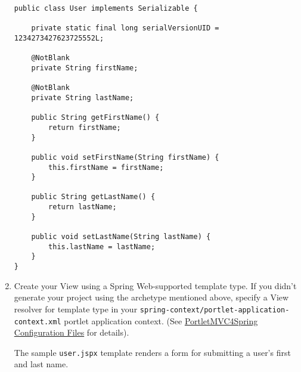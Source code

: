 \begin{enumerate}
\begin{verbatim}
public class User implements Serializable {

    private static final long serialVersionUID = 1234273427623725552L;

    @NotBlank
    private String firstName;

    @NotBlank
    private String lastName;

    public String getFirstName() {
        return firstName;
    }

    public void setFirstName(String firstName) {
        this.firstName = firstName;
    }

    public String getLastName() {
        return lastName;
    }

    public void setLastName(String lastName) {
        this.lastName = lastName;
    }
}
\end{verbatim}
\item
  Create your View using a Spring Web-supported template type. If you
  didn't generate your project using the archetype mentioned above,
  specify a View resolver for template type in your
  \texttt{spring-context/portlet-application-context.xml} portlet
  application context. (See
  \href{/docs/7-2/reference/-/knowledge_base/r/portletmvc4spring-configuration-files}{PortletMVC4Spring
  Configuration Files} for details).

  The sample \texttt{user.jspx} template renders a form for submitting a
  user's first and last name.


\end{enumerate}

